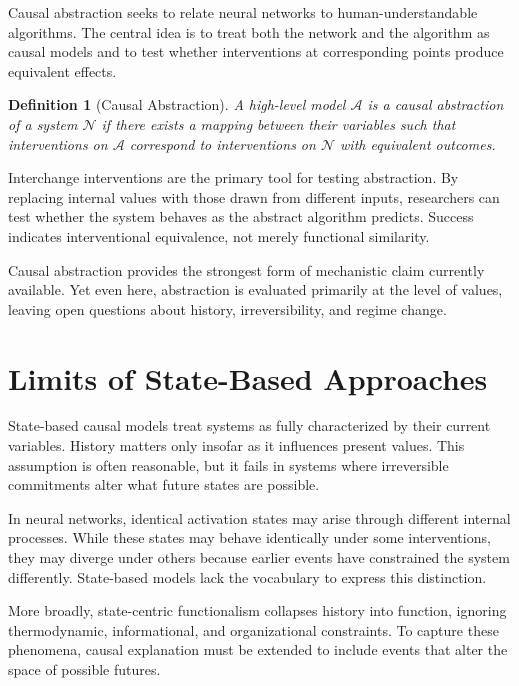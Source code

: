 \documentclass[11pt]{article}
\newtheorem{definition}{Definition}
\theoremstyle{remark}
\newcommand{\NN}{\mathcal{N}}
\newcommand{\Alg}{\mathcal{A}}
\begin{document}
Causal abstraction seeks to relate neural networks to human-understandable algorithms. The central idea is to treat both the network and the algorithm as causal models and to test whether interventions at corresponding points produce equivalent effects.

\begin{definition}[Causal Abstraction]
A high-level model $\Alg$ is a causal abstraction of a system $\NN$ if there exists a mapping between their variables such that interventions on $\Alg$ correspond to interventions on $\NN$ with equivalent outcomes.
\end{definition}

Interchange interventions are the primary tool for testing abstraction. By replacing internal values with those drawn from different inputs, researchers can test whether the system behaves as the abstract algorithm predicts. Success indicates interventional equivalence, not merely functional similarity.

Causal abstraction provides the strongest form of mechanistic claim currently available. Yet even here, abstraction is evaluated primarily at the level of values, leaving open questions about history, irreversibility, and regime change.

\section{Limits of State-Based Approaches}

State-based causal models treat systems as fully characterized by their current variables. History matters only insofar as it influences present values. This assumption is often reasonable, but it fails in systems where irreversible commitments alter what future states are possible.

In neural networks, identical activation states may arise through different internal processes. While these states may behave identically under some interventions, they may diverge under others because earlier events have constrained the system differently. State-based models lack the vocabulary to express this distinction.

More broadly, state-centric functionalism collapses history into function, ignoring thermodynamic, informational, and organizational constraints. To capture these phenomena, causal explanation must be extended to include events that alter the space of possible futures.
\end{document}
